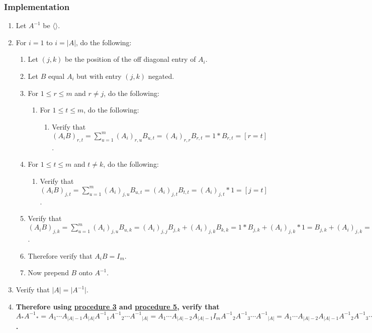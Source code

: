 \documentclass[twocolumn]{article}
\begin{document}
			\subsubsection{Implementation}
				\begin{enumerate}
					\item Let $A^{-1}$ be $\langle\rangle$.
					\item For $i=1$ to $i=\lvert A\rvert$, do the following:
					\begin{enumerate}
						\item Let $(j,k)$ be the position of the off diagonal entry of $A_i$.
						\item Let $B$ equal $A_i$ but with entry $(j,k)$ negated.
						\item For $1\le r\le m$ and $r\ne j$, do the following:
						\begin{enumerate}
							\item For $1\le t\le m$, do the following:
							\begin{enumerate}
								\item Verify that $(A_iB)_{r,t}=\sum_{u=1}^m (A_i)_{r,u}B_{u,t}=(A_i)_{r,r}B_{r,t}=1*B_{r,t}=[r=t]$.
							\end{enumerate}
						\end{enumerate}
						\item For $1\le t\le m$ and $t\ne k$, do the following:
						\begin{enumerate}
							\item Verify that $(A_iB)_{j,t}=\sum_{u=1}^m (A_i)_{j,u}B_{u,t}=(A_i)_{j,t}B_{t,t}=(A_i)_{j,t}*1=[j=t]$.
						\end{enumerate}
						\item Verify that $(A_iB)_{j,k}=\sum_{u=1}^m (A_i)_{j,u}B_{u,k}=(A_i)_{j,j}B_{j,k}+(A_i)_{j,k}B_{k,k}=1*B_{j,k}+(A_i)_{j,k}*1=B_{j,k}+(A_i)_{j,k}=0$.
						\item Therefore verify that $A_iB=I_m$.
						\item Now prepend $B$ onto $A^{-1}$.
					\end{enumerate}
					\item Verify that $\lvert A\rvert=\lvert A^{-1}\rvert$.
					\item \textbf{Therefore using \hyperref[sec:procedure 3]{procedure 3} and \hyperref[sec:procedure 5]{procedure 5}, verify that $A_*{A^{-1}}_*=A_1\cdots A_{\lvert A\rvert-1}A_{\lvert A\rvert}{A^{-1}}_1{A^{-1}}_2\cdots {A^{-1}}_{\lvert A\rvert}=A_1\cdots A_{\lvert A\rvert-2}A_{\lvert A\rvert-1}I_m{A^{-1}}_2{A^{-1}}_3\cdots {A^{-1}}_{\lvert A\rvert}=A_1\cdots A_{\lvert A\rvert-2}A_{\lvert A\rvert-1}{A^{-1}}_2{A^{-1}}_3\cdots {A^{-1}}_{\lvert A\rvert}=\cdots=A_1I_m{A^{-1}}_{\lvert A\rvert}=A_1{A^{-1}}_{\lvert A\rvert}=I_m$.}
				\end{enumerate}
\end{document}
